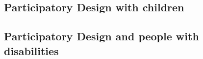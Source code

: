 \subsection{Participatory Design with children}
\subsection{Participatory Design and people with disabilities}
